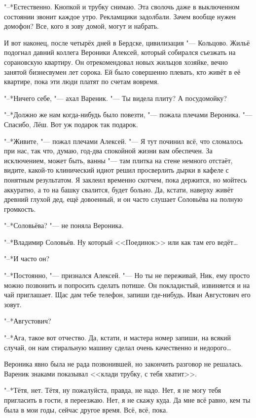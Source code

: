 "--*Естественно.
Кнопкой и трубку снимаю.
Эта сволочь даже в выключенном состоянии звонит каждое утро.
Рекламщики задолбали.
Зачем вообще нужен домофон?
Все, кого я зову домой, могут и набрать.

И вот наконец, после четырёх дней в Бердске, цивилизация "--- Кольцово.
Жильё подогнал давний коллега Вероники Алексей, который собирался съезжать на сорановскую квартиру.
Он отрекомендовал новых жильцов хозяйке, вечно занятой бизнесвумен лет сорока.
Ей было совершенно плевать, кто живёт в её квартире, пока эти люди платят по счетам вовремя.

"--*Ничего себе, "--- ахал Вареник.
"--- Ты видела плиту?
А посудомойку?

"--*Должно же нам когда-нибудь было повезти, "--- пожала плечами Вероника.
"--- Спасибо, Лёш.
Вот уж подарок так подарок.

"--*Живите, "--- пожал плечами Алексей.
"--- Я тут починил всё, что сломалось при нас, так что, думаю, год-два спокойной жизни вам обеспечен.
За исключением, может быть, ванны "--- там плитка на стене немного отстаёт, видите, какой-то клинический идиот решил просверлить дырки в кафеле с понятным результатом.
Я заклеил временно скотчем, пока держится, но мойтесь аккуратно, а то на башку свалится, будет больно.
Да, кстати, наверху живёт древний глухой дед, ещё довоенный, и он часто слушает Соловьёва на полную громкость.

"--*Соловьёва? "--- не поняла Вероника.

"--*Владимир Соловьёв.
Ну который <<Поединок>> или как там его ведёт\ldots{}

"--*И часто он?

"--*Постоянно, "--- признался Алексей.
"--- Но ты не переживай, Ник, ему просто можно позвонить и попросить сделать потише.
Он покладистый, извиняется и на чай приглашает.
Щас дам тебе телефон, запиши где-нибудь.
Иван Августович его зовут.

"--*Августович?

"--*Ага, такое вот отчество.
Да, кстати, и мастера номер запиши, на всякий случай, он нам стиральную машину сделал очень качественно и недорого\ldots{}

\asterism

\textspace

Вероника явно была не рада позвонившей, но закончить разговор не решалась.
Вареник знаками показывал <<клади трубку, с тебя хватит>>.

"--*Тётя, нет.
Тётя, ну пожалуйста, правда, не надо.
Нет, я не могу тебя пригласить в гости, я переезжаю.
Нет, я не скажу куда.
Да мне всё равно, кем ты была в мои годы, сейчас другое время.
Всё, всё, пока.

